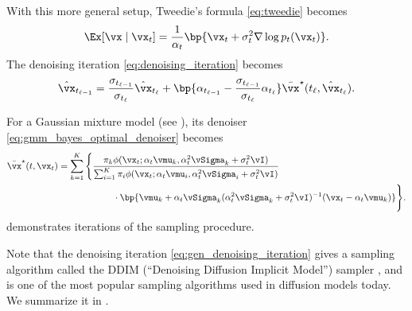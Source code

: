 \documentclass[../../book-main.tex]{subfiles}
\begin{document}
With this more general setup, Tweedie's formula \eqref{eq:tweedie} becomes
\begin{equation}\label{eq:gen_tweedie}
    \Ex[\vx \mid \vx_{t}] = \frac{1}{\alpha_{t}}\bp{\vx_{t} +
    \sigma_{t}^{2}\nabla \log p_{t}(\vx_{t})}.
\end{equation}
The denoising iteration \eqref{eq:denoising_iteration} becomes
\begin{equation}\label{eq:gen_denoising_iteration}
    \hat{\vx}_{t_{\ell - 1}} = \frac{\sigma_{t_{\ell -
    1}}}{\sigma_{t_{\ell}}}\hat{\vx}_{t_{\ell}} + \bp{\alpha_{t_{\ell
        - 1}} - \frac{\sigma_{t_{\ell -
    1}}}{\sigma_{t_{\ell}}}\alpha_{t_{\ell}}}\bar{\vx}^{\star}(t_{\ell},
    \hat{\vx}_{t_{\ell}}).
\end{equation}

\begin{example}
    For a Gaussian mixture model (see ),
    its denoiser \eqref{eq:gmm_bayes_optimal_denoiser} becomes
    \begin{align}\label{eq:gen_gmm_bayes_optimal_denoiser}
        \bar{\vx}^{\star}(t, \vx_{t})
        &= \sum_{k = 1}^{K}\Bigg\{\frac{\pi_{k}\phi(\vx_{t}
                    ; \alpha_{t}\vmu_{k}, \alpha_{t}^{2}\vSigma_{k}
            + \sigma_{t}^{2}\vI)}{\sum_{i = 1}^{K}\pi_{i}\phi(\vx_{t} ;
                    \alpha_{t}\vmu_{i}, \alpha_{t}^{2}\vSigma_{i} +
            \sigma_{t}^{2}\vI)} \\
            &\qquad \qquad \qquad \cdot\bp{\vmu_{k} +
                \alpha_{t}\vSigma_{k}(\alpha_{t}^{2}\vSigma_{k} +
        \sigma_{t}^{2}\vI)^{-1}(\vx_{t} - \alpha_{t}\vmu_{k})}\Bigg\}. \nonumber
    \end{align}
     demonstrates iterations of the
    sampling procedure.
\end{example}

Note that the denoising iteration \eqref{eq:gen_denoising_iteration}
gives a sampling algorithm called the DDIM (``Denoising Diffusion
Implicit Model'') sampler \cite{song2020denoising}, and is one of the
most popular sampling algorithms used in diffusion models today. We
summarize it in .
\end{document}
